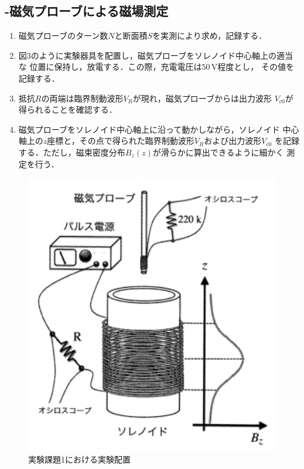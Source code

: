 \subsection{-磁気プローブによる磁場測定}
\begin{enumerate}
    \item 磁気プローブのターン数$N$と断面積$S$を実測により求め，記録する．
    \item 図3のように実験器具を配置し，磁気プローブをソレノイド中心軸上の適当な
    位置に保持し，放電する．この際，充電電圧は$50\,\si{\volt}$程度とし，
    その値を記録する．
    \item 抵抗$R$の両端は臨界制動波形$V_R$が現れ，磁気プローブからは出力波形
    $V_{c0}$が得られることを確認する．
    \item 磁気プローブをソレノイド中心軸上に沿って動かしながら，ソレノイド
    中心軸上の$z$座標と，その点で得られた臨界制動波形$V_R$および出力波形$V_{c0}$
    を記録する．ただし，磁束密度分布$B_z(z)$が滑らかに算出できるように細かく
    測定を行う．
\end{enumerate}
\begin{figure}[!ht]
    \centering
    \includegraphics[scale=1]{figure3.pdf}
    \caption{実験課題1における実験配置}
\end{figure}

